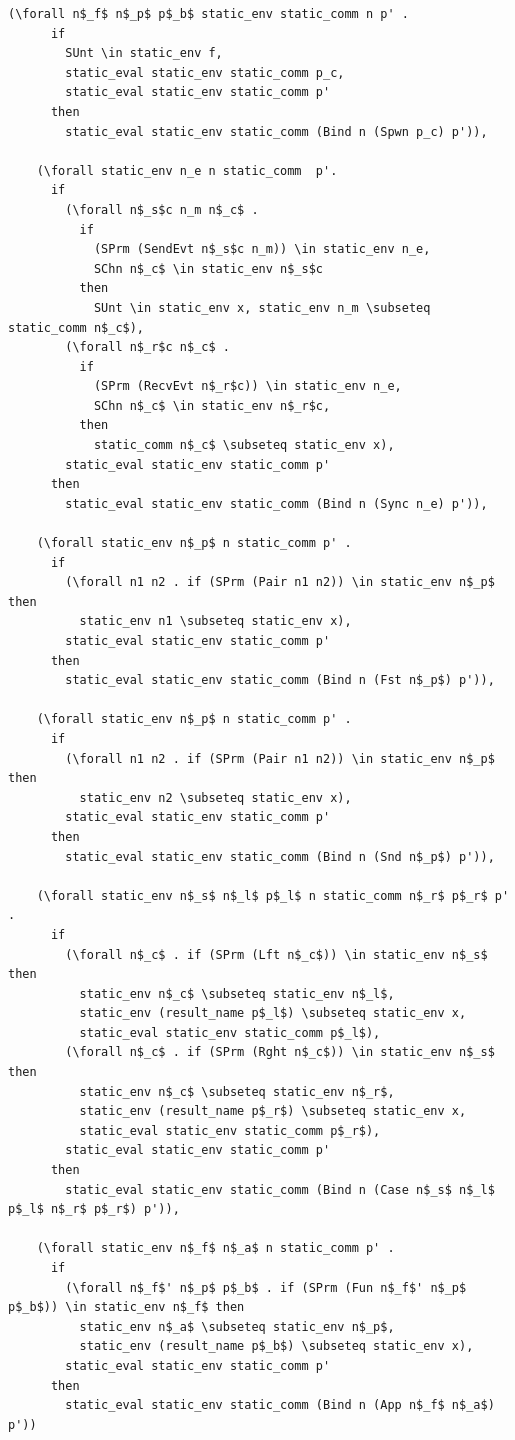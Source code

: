 \documentclass[10pt]{article}
\begin{document}
\begin{lstlisting}[language=logic, mathescape]
    (\forall n$_f$ n$_p$ p$_b$ static_env static_comm n p' .
      if
        SUnt \in static_env f, 
        static_eval static_env static_comm p_c, 
        static_eval static_env static_comm p'
      then
        static_eval static_env static_comm (Bind n (Spwn p_c) p')),

    (\forall static_env n_e n static_comm  p'.
      if
        (\forall n$_s$c n_m n$_c$ . 
          if
            (SPrm (SendEvt n$_s$c n_m)) \in static_env n_e, 
            SChn n$_c$ \in static_env n$_s$c 
          then
            SUnt \in static_env x, static_env n_m \subseteq static_comm n$_c$),
        (\forall n$_r$c n$_c$ . 
          if
            (SPrm (RecvEvt n$_r$c)) \in static_env n_e,
            SChn n$_c$ \in static_env n$_r$c, 
          then
            static_comm n$_c$ \subseteq static_env x),
        static_eval static_env static_comm p'
      then
        static_eval static_env static_comm (Bind n (Sync n_e) p')),

    (\forall static_env n$_p$ n static_comm p' . 
      if
        (\forall n1 n2 . if (SPrm (Pair n1 n2)) \in static_env n$_p$ then
          static_env n1 \subseteq static_env x),
        static_eval static_env static_comm p'
      then
        static_eval static_env static_comm (Bind n (Fst n$_p$) p')),

    (\forall static_env n$_p$ n static_comm p' . 
      if
        (\forall n1 n2 . if (SPrm (Pair n1 n2)) \in static_env n$_p$ then
          static_env n2 \subseteq static_env x),
        static_eval static_env static_comm p'
      then
        static_eval static_env static_comm (Bind n (Snd n$_p$) p')),

    (\forall static_env n$_s$ n$_l$ p$_l$ n static_comm n$_r$ p$_r$ p' . 
      if
        (\forall n$_c$ . if (SPrm (Lft n$_c$)) \in static_env n$_s$ then 
          static_env n$_c$ \subseteq static_env n$_l$,
          static_env (result_name p$_l$) \subseteq static_env x,
          static_eval static_env static_comm p$_l$),
        (\forall n$_c$ . if (SPrm (Rght n$_c$)) \in static_env n$_s$ then 
          static_env n$_c$ \subseteq static_env n$_r$, 
          static_env (result_name p$_r$) \subseteq static_env x, 
          static_eval static_env static_comm p$_r$),
        static_eval static_env static_comm p'
      then
        static_eval static_env static_comm (Bind n (Case n$_s$ n$_l$ p$_l$ n$_r$ p$_r$) p')),

    (\forall static_env n$_f$ n$_a$ n static_comm p' . 
      if
        (\forall n$_f$' n$_p$ p$_b$ . if (SPrm (Fun n$_f$' n$_p$ p$_b$)) \in static_env n$_f$ then 
          static_env n$_a$ \subseteq static_env n$_p$, 
          static_env (result_name p$_b$) \subseteq static_env x),
        static_eval static_env static_comm p'
      then
        static_eval static_env static_comm (Bind n (App n$_f$ n$_a$) p'))
  \end{lstlisting}
\end{document}
